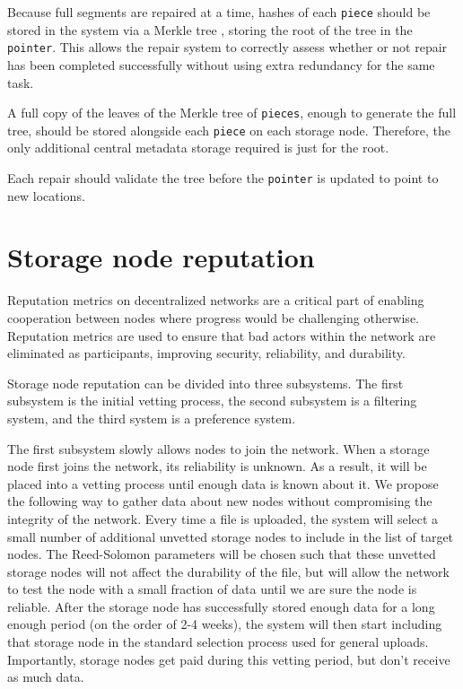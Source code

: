 \documentclass[11pt,fleqn,openany]{book}
\newcommand{\x}[1]{{\tt #1}} \newcommand{\code}[1]{{\em #1}}
\begin{document}
Because full segments are repaired at a time, hashes of
each \x{piece} should be stored in the system via a Merkle tree
\cite{merkle-tree}, storing the root of the tree in the \x{pointer}. This allows
the repair system to correctly assess whether or not repair has been completed
successfully without using extra redundancy for the same task.

A full copy of the leaves of the Merkle tree of \x{pieces}, enough to generate
the full tree, should be stored alongside each \x{piece} on each storage node.
Therefore, the only additional central metadata storage required is just for
the root.

Each repair should validate the tree before the \x{pointer} is updated to
point to new locations.

\section{Storage node reputation}\label{sec:concrete-reputation}

Reputation metrics on decentralized networks are a critical part of
enabling cooperation
between nodes
where progress would be challenging otherwise. Reputation metrics
are used to ensure that bad actors
within the network are eliminated as participants, improving security,
reliability, and durability.

Storage node reputation can be divided into three subsystems. The first
subsystem is the initial vetting process, the second subsystem is a filtering
system, and the third system is a preference system.

The first subsystem slowly allows nodes to join the network.
When a storage node first joins the network, its reliability is unknown.
As a result, it will be placed into a vetting
process until enough data is known about it.
We propose the following way to gather data about new nodes
without compromising the integrity of the network.
Every time a file is uploaded, the system will select a small number of
additional unvetted storage nodes to include in the list of target nodes.
The Reed-Solomon parameters will be chosen such that these unvetted storage
nodes will not affect the durability of the file, but will allow the network
to test the node
with a small fraction of data until we are sure the node is reliable.
After the storage node has successfully stored enough data for a long enough
period (on the order of 2-4 weeks),
the system will then start including that storage
node in the standard selection process used for general uploads.
Importantly, storage nodes get paid during this
vetting period, but don't receive as much data.
\end{document}
